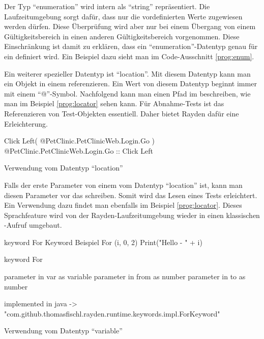 \SuperPar
Der Typ "`enumeration"' wird intern als "`string"' repräsentiert. Die Laufzeitumgebung sorgt dafür, dass nur die vordefinierten Werte zugewiesen werden dürfen. Diese Überprüfung wird aber nur bei einem Übergang von einem Gültigkeitsbereich in einen anderen Gültigkeitsbereich vorgenommen. Diese Einschränkung ist damit zu erklären, dass ein "`enumeration"'-Datentyp genau für ein  definiert wird. Ein Beispiel dazu sieht man im Code-Ausschnitt \ref{prog:enum}.  

\SuperPar
Ein weiterer spezieller Datentyp ist "`location"'. Mit diesem Datentyp kann man ein Objekt in einem  referenzieren. Ein Wert von diesem Datentyp beginnt immer mit einem "`@"'-Symbol. Nachfolgend kann man einen Pfad im  beschreiben, wie man im Beispiel \ref{prog:locator} sehen kann. Für Abnahme-Tests ist das Referenzieren von Test-Objekten essentiell. Daher bietet Rayden dafür eine Erleichterung. 

\begin{program}
\begin{JavaCode}
Click Left( @PetClinic.PetClinicWeb.Login.Go )
@PetClinic.PetClinicWeb.Login.Go :: Click Left
\end{JavaCode}
\caption{Verwendung vom Datentyp "`location"'}
\label{prog:locator}
\end{program}

\SuperPar
Falls der erste Parameter von einem  vom Datentyp "`location"' ist, kann man diesen Parameter vor das  schreiben. Somit wird das Lesen eines Tests erleichtert. Ein Verwendung dazu findet man ebenfalls im Beispiel \ref{prog:locator}. Dieses Sprachfeature wird von der Rayden-Laufzeitumgebung wieder in einen klassischen -Aufruf umgebaut.

\begin{program}
\begin{JavaCode}

keyword For Keyword Beispiel{
	For (i, 0, 2){
		Print("Hello - " + i)
	}
}

keyword For { 
	parameter in var as variable
	parameter in from as number
	parameter in to as number

	implemented in java -> "com.github.thomasfischl.rayden.runtime.keywords.impl.ForKeyword"
}
\end{JavaCode}
\caption{Verwendung vom Datentyp "`variable"'}
\label{prog:variable}
\end{program}


